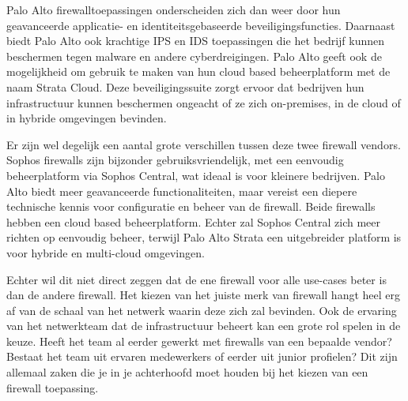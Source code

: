 \vspace{5mm}
Palo Alto firewalltoepassingen onderscheiden zich dan weer door hun geavanceerde applicatie- en identiteitsgebaseerde beveiligingsfuncties. Daarnaast biedt Palo Alto ook krachtige IPS en IDS toepassingen die het bedrijf kunnen beschermen tegen malware en andere cyberdreigingen. Palo Alto geeft ook de mogelijkheid om gebruik te maken van hun cloud based beheerplatform met de naam Strata Cloud. Deze beveiligingssuite zorgt ervoor dat bedrijven hun infrastructuur kunnen beschermen ongeacht of ze zich on-premises, in de cloud of in hybride omgevingen bevinden. \autocite{shread2023}

\vspace{5mm}
Er zijn wel degelijk een aantal grote verschillen tussen deze twee firewall vendors. Sophos firewalls zijn bijzonder gebruiksvriendelijk, met een eenvoudig beheerplatform via Sophos Central, wat ideaal is voor kleinere bedrijven. Palo Alto biedt meer geavanceerde functionaliteiten, maar vereist een diepere technische kennis voor configuratie en beheer van de firewall. Beide firewalls hebben een cloud based beheerplatform. Echter zal Sophos Central zich meer richten op eenvoudig beheer, terwijl Palo Alto Strata een uitgebreider platform is voor hybride en multi-cloud omgevingen. \autocite{paloGuard2025} 

\vspace{5mm}
Echter wil dit niet direct zeggen dat de ene firewall voor alle use-cases beter is dan de andere firewall. Het kiezen van het juiste merk van firewall hangt heel erg af van de schaal van het netwerk waarin deze zich zal bevinden. Ook de ervaring van het netwerkteam dat de infrastructuur beheert kan een grote rol spelen in de keuze. Heeft het team al eerder gewerkt met firewalls van een bepaalde vendor? Bestaat het team uit ervaren medewerkers of eerder uit junior profielen? Dit zijn allemaal zaken die je in je achterhoofd moet houden bij het kiezen van een firewall toepassing.



